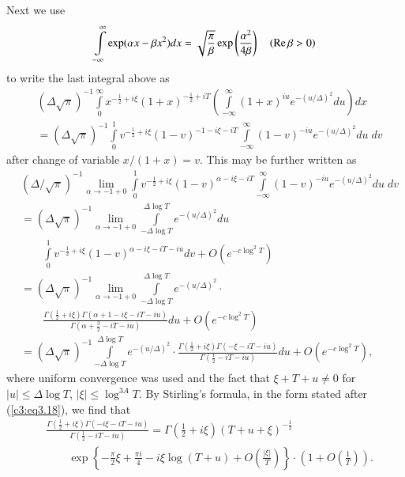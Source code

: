 Next we use
$$ 
\int\limits^\infty_{-\infty} \exp (\alpha x - \beta x^2) dx =
\sqrt{\frac{\pi}{\beta}} \exp \left(\frac{\alpha^2}{4\beta} \right)
\quad (\operatorname{Re} \beta > 0)  
$$
to write the last integral above as
\begin{align*}
& (\Delta \sqrt{\pi})^{-1} \int\limits^\infty_0 x^{-\frac{1}{2} + i
    \xi} (1+x)^{-\frac{1}{2}+ iT} \left(\int\limits^\infty_{-\infty}
  (1+x)^{iu} e^{-(u/\Delta)^2} du \right) dx\\ 
& = (\Delta \sqrt{\pi})^{-1} \int\limits^1_0 v^{-\frac{1}{2} + i \xi}
  (1-v)^{-1-i\xi - iT} \int\limits^\infty_{-\infty} (1-v)^{-iu}
  e^{-(u/\Delta)^2} du \; dv 
\end{align*}
after change of variable $x/(1+x) =v$. This may be further written as 
\begin{align*}
& (\Delta/\sqrt{\pi})^{-1} \lim\limits_{\alpha \to -1 + 0} \int\limits^1_0 
v^{-\frac{1}{2} + i \xi} (1-v)^{\alpha-i\xi-iT} \int\limits^{\infty}_{-\infty} 
(1-v)^{-iu} e^{-(u/\Delta)^2} du \; dv\\
& = (\Delta \sqrt{\pi})^{-1} \lim\limits_{\alpha \to - 1 + 0 }
\int\limits^{\Delta \log T}_{-\Delta \log T} e^{-(u/\Delta)^2} du \\ 
& \qquad \int\limits^1_0 v^{-\frac{1}{2} + i \xi} (1-v)^{\alpha - i
  \xi  - i T - iu} dv + O (e^{-c\log^2 T}) \\ 
&= (\Delta \sqrt{\pi})^{-1} \lim\limits_{\alpha \to -1+0 }
\int\limits^{\Delta \log T}_{-\Delta \log T} e^{-(u/\Delta)^2} \cdot
\\ 
& \qquad \frac{\Gamma (\frac{1}{2} + i \xi) \Gamma (\alpha + 1 - i \xi
  - iT - iu)}{\Gamma (\alpha + \frac{3}{2} - i T - iu)} du + O
(e^{-c\log^2 T})\\ 
&= (\Delta \sqrt{\pi})^{-1} \int\limits^{\Delta \log T}_{-\Delta \log
  T} e^{-(u/\Delta)^2} \cdot \frac{\Gamma (\frac{1}{2} + i \xi) \Gamma
  (-\xi - iT- iu)}{\Gamma (\frac{1}{2} - iT - iu)} du + O (e^{-c\log^2
  T}), 
\end{align*}
where uniform convergence was used and the fact that $\xi + T + u \neq
0$ for $|u| \leq \Delta \log T$, $|\xi| \leq \log^{3A} T$. By
Stirling's formula, in the form stated after (\ref{c3:eq3.18}), we
find that  
\begin{align*}
& \frac{\Gamma (\frac{1}{2} + i \xi) \Gamma (-i \xi - iT - i
    u)}{\Gamma (\frac{1}{2} - iT - i u)} =  \Gamma \left(\frac{1}{2} +
  i \xi \right) (T + u + \xi)^{-\frac{1}{2}}\\ 
&\qquad  \exp \left\{-\frac{\pi}{2} \xi + \frac{\pi i}{4} - i \xi \log
  (T+u) + O \left(\frac{|\xi|}{T} \right) \right\} \cdot \left(1+O
  \left(\frac{1}{T} \right) \right). 
\end{align*}\pageoriginale

